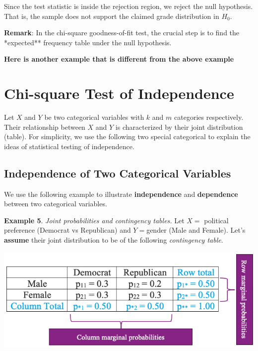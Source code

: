 \documentclass[
]{article}
\begin{document}
Since the test statistic is inside the rejection region, we reject the
null hypothesis. That is, the sample does not support the claimed grade
distribution in \(H_0\).

\textbf{Remark}: In the chi-square goodness-of-fit test, the crucial
step is to find the *expected** frequency table under the null
hypothesis.

\hfill\break

\textbf{Here is another example that is different from the above
example}

\hfill\break

\hfill\break

\hypertarget{chi-square-test-of-independence}{%
\section{Chi-square Test of
Independence}\label{chi-square-test-of-independence}}

Let \(X\) and \(Y\) be two categorical variables with \(k\) and \(m\)
categories respectively. Their relationship between \(X\) and \(Y\) is
characterized by their joint distribution (table). For simplicity, we
use the following two special categorical to explain the ideas of
statistical testing of independence.

\hypertarget{independence-of-two-categorical-variables}{%
\subsection{Independence of Two Categorical
Variables}\label{independence-of-two-categorical-variables}}

We use the following example to illustrate \textbf{independence} and
\textbf{dependence} between two categorical variables.

\textbf{Example 5}. \emph{Joint probabilities and contingency tables.}
Let \(X =\) political preference (Democrat vs Republican) and
\(Y =\)gender (Male and Female). Let's \textbf{assume} their joint
distribution to be of the following \emph{contingency table}.

\begin{center}\includegraphics[width=0.65\linewidth]{week13/twoWayContingencyTable} \end{center}
\end{document}

